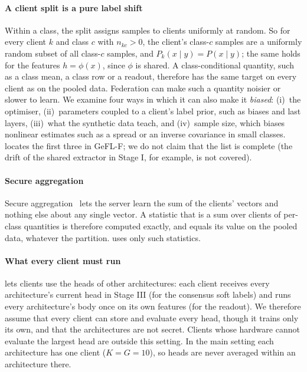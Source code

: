 \paragraph{A client split is a pure label shift} Within a class, the split assigns samples to clients uniformly at
random. So for every client $k$ and class $c$ with $n_{kc}>0$, the client's class-$c$ samples are a uniformly random
subset of all class-$c$ samples, and $P_k(x\mid y)=P(x\mid y)$; the same holds for the features $h=\phi(x)$, since
$\phi$ is shared. A class-conditional quantity, such as a class mean, a class row or a readout, therefore has the
same target on every client as on the pooled data. Federation can make such a quantity noisier or slower to learn.
We examine four ways in which it can also make it \emph{biased}: (i)~the optimiser, (ii)~parameters coupled to a
client's label prior, such as biases and last layers, (iii)~what the synthetic data teach, and (iv)~sample size, which
biases nonlinear estimates such as a spread or an inverse covariance in small classes.  locates the
first three in GeFL-F; we do not claim that the list is complete (the drift of the shared extractor in Stage I, for
example, is not covered).

\paragraph{Secure aggregation} Secure aggregation~\cite{bonawitz2017secagg,bell2020secaggplus} lets the server learn
the sum of the clients' vectors and nothing else about any single vector. A statistic that is a sum over clients of
per-class quantities is therefore computed exactly, and equals its value on the pooled data, whatever the partition.
\ours uses only such statistics.

\paragraph{What every client must run} \ours lets clients use the heads of other
architectures: each client receives every architecture's current head in Stage III (for the consensus soft labels)
and runs every architecture's body once on its own features (for the readout). We therefore assume that every client
can store and evaluate every head, though it trains only its own, and that the architectures are not secret. Clients
whose hardware cannot evaluate the largest head are outside this setting. In the main setting each architecture has
one client ($K=G=10$), so heads are never averaged within an architecture there.
